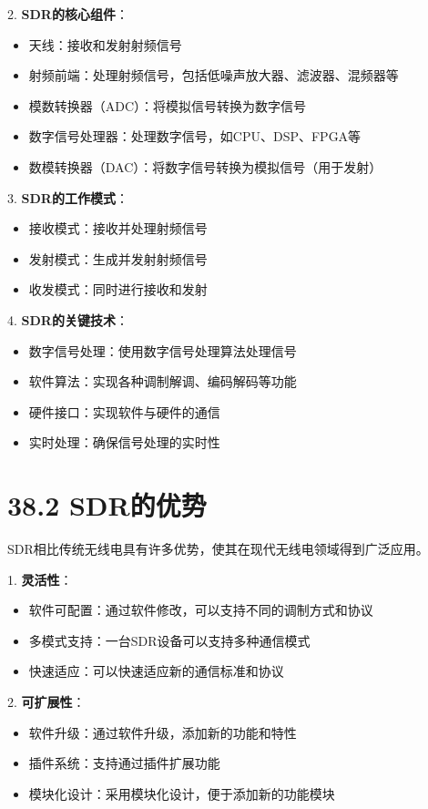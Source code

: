 \documentclass[12pt,UTF8]{ctexbook}
\begin{document}
2. \textbf{SDR的核心组件}：
   \begin{itemize}[leftmargin=3.5em]
   \item 天线：接收和发射射频信号
   \item 射频前端：处理射频信号，包括低噪声放大器、滤波器、混频器等
   \item 模数转换器（ADC）：将模拟信号转换为数字信号
   \item 数字信号处理器：处理数字信号，如CPU、DSP、FPGA等
   \item 数模转换器（DAC）：将数字信号转换为模拟信号（用于发射）
   \end{itemize}

3. \textbf{SDR的工作模式}：
   \begin{itemize}[leftmargin=3.5em]
   \item 接收模式：接收并处理射频信号
   \item 发射模式：生成并发射射频信号
   \item 收发模式：同时进行接收和发射
   \end{itemize}

4. \textbf{SDR的关键技术}：
   \begin{itemize}[leftmargin=3.5em]
   \item 数字信号处理：使用数字信号处理算法处理信号
   \item 软件算法：实现各种调制解调、编码解码等功能
   \item 硬件接口：实现软件与硬件的通信
   \item 实时处理：确保信号处理的实时性
   \end{itemize}

\section*{38.2 SDR的优势}

SDR相比传统无线电具有许多优势，使其在现代无线电领域得到广泛应用。

1. \textbf{灵活性}：
   \begin{itemize}[leftmargin=3.5em]
   \item 软件可配置：通过软件修改，可以支持不同的调制方式和协议
   \item 多模式支持：一台SDR设备可以支持多种通信模式
   \item 快速适应：可以快速适应新的通信标准和协议
   \end{itemize}

2. \textbf{可扩展性}：
   \begin{itemize}[leftmargin=3.5em]
   \item 软件升级：通过软件升级，添加新的功能和特性
   \item 插件系统：支持通过插件扩展功能
   \item 模块化设计：采用模块化设计，便于添加新的功能模块
   \end{itemize}
\end{document}
